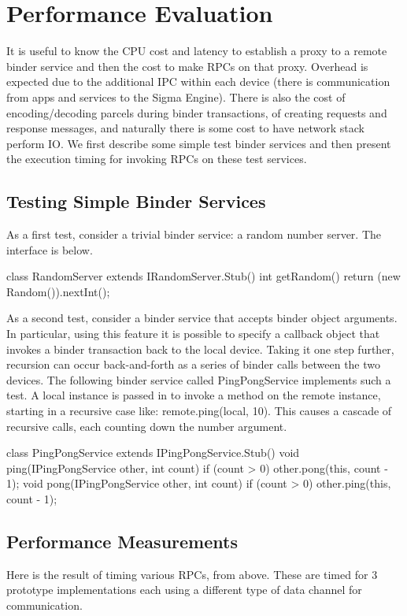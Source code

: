 \documentclass[prodmode]{acmlarge}
\begin{document}
\section{Performance Evaluation}
\label{sec:Performance}
It is useful to know the CPU cost and latency to establish a proxy to a remote binder service and then the cost to make RPCs on that proxy. Overhead is expected due to the additional IPC within each device (there is communication from apps and services to the Sigma Engine). There is also the cost of encoding/decoding parcels during binder transactions, of creating requests and response messages, and naturally there is some cost to have network stack perform IO. We first describe some simple test binder services and then present the execution timing for invoking RPCs on these test services.

\subsection{Testing Simple Binder Services}
As a first test, consider a trivial binder service: a random number server. The interface is below.

\begin{snippet}
class RandomServer extends IRandomServer.Stub() {
  int getRandom() { return (new Random()).nextInt(); }}
\end{snippet}

As a second test, consider a binder service that accepts binder object arguments. In particular, using this feature it is possible to specify a callback object that invokes a binder transaction back to the local device. Taking it one step further, recursion can occur back-and-forth as a series of binder calls between the two devices. The following binder service called PingPongService implements such a test. A local instance is passed in to invoke a method on the remote instance, starting in a recursive case like: remote.ping(local, 10). This causes a cascade of recursive calls, each counting down the number argument.

\begin{snippet}
class PingPongService extends
    IPingPongService.Stub() {
  void ping(IPingPongService other, int count) {
    if (count > 0) other.pong(this, count - 1);
  }
  void pong(IPingPongService other, int count) {
    if (count > 0) other.ping(this, count - 1);
  }
}
\end{snippet}

\subsection{Performance Measurements}
Here is the result of timing various RPCs, from above. These are timed for 3 prototype implementations each using a different type of data channel for communication.
\end{document}
